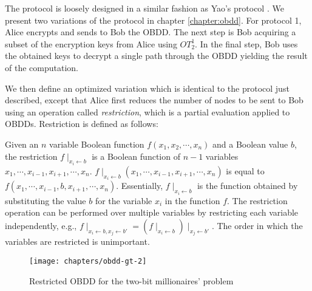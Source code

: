 The protocol is loosely designed in a similar fashion as Yao's protocol
\cite{Yao86}. We present two variations of the protocol in chapter \ref{chapter:obdd}.
For protocol 1, Alice encrypts and sends to Bob the OBDD. The next step is Bob
acquiring a subset of the encryption keys from Alice using $OT_{2}^{1}$.
In the final step, Bob uses the obtained keys to decrypt a single
path through the OBDD yielding the result of the computation. %




%


We then define an optimized variation which is identical to the protocol
just described, except that Alice first reduces the number of nodes
to be sent to Bob using an operation called \emph{restriction}, which
is a partial evaluation applied to OBDDs. Restriction is defined as
follows:

Given an $n$ variable Boolean function $f(x_{1},x_{2},\cdots,x_{n})$
and a Boolean value $b$, the restriction $f\mid_{x_{i}\leftarrow b}$
is a Boolean function of $n-1$ variables $x_{1},\cdots,x_{i-1},x_{i+1},\cdots,x_{n}$.
$f\mid_{x_{i}\leftarrow b}(x_{1},\cdots,x_{i-1},x_{i+1},\cdots,x_{n})$
is equal to $f(x_{1},\cdots,x_{i-1},b,x_{i+1},\cdots,x_{n})$. Essentially,
$f\mid_{x_{i}\leftarrow b}$ is the function obtained by substituting
the value $b$ for the variable $x_{i}$ in the function $f$. The
restriction operation can be performed over multiple variables by
restricting each variable independently, e.g., $f\mid_{x_{i}\leftarrow b,x_{j}\leftarrow b'}=(f\mid_{x_{i}\leftarrow b})\mid_{x_{j}\leftarrow b'}$.
The order in which the variables are restricted is unimportant.

\begin{figure}
\begin{centering}
\texttt{[image: chapters/obdd-gt-2]} 
\par\end{centering}
\caption{\label{fig:obdd-gt-2}Restricted OBDD for the two-bit millionaires' problem}
\end{figure}

